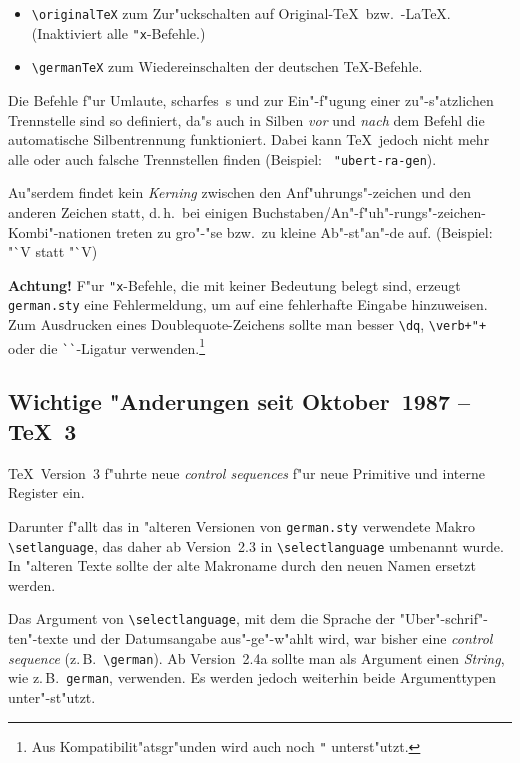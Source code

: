 \begin{itemize}
\item
\verb:\originalTeX:
zum Zur"uckschalten auf Original-\TeX\ bzw.\ \mbox{-\LaTeX}.
(Inaktiviert alle \verb:"x:-Befehle.)

\item
\verb:\germanTeX:
zum Wiedereinschalten der deutschen \TeX-Befehle.
\end{itemize}

Die Befehle f"ur Umlaute, scharfes~s und zur Ein"-f"ugung einer
zu"-s"atzlichen Trennstelle sind so definiert, da"s auch in
Silben {\em vor\/} und {\em nach\/} dem Befehl die automatische
Silbentrennung funktioniert. Dabei kann \TeX\ jedoch nicht mehr
alle oder auch falsche Trennstellen finden (Beispiel: {\tt
"ubert-ra-gen}).

Au"serdem findet kein {\em Kerning} zwischen den
An\-f"uh\-rungs"-zeichen und den anderen Zeichen statt, d.\,h.\ bei
einigen Buchstaben\slash An"-f"uh"-rungs"-zeichen-Kombi"-nationen
treten zu gro"-"se bzw.\ zu kleine Ab"-st"an"-de auf.  (Beispiel: "`V
statt "`\negthinspace V)

{\bf Achtung!} F"ur \verb:"x:-Befehle, die mit keiner Bedeutung belegt
sind, erzeugt {\tt german.sty} eine Fehlermeldung, um auf eine
fehlerhafte Eingabe hinzuweisen.  Zum Ausdrucken eines
Doublequote-Zeichens sollte man besser \verb:\dq:, \verb:\verb+"+:
oder die \verb:``:-Ligatur verwenden.\footnote{Aus
Kompatibilit"atsgr"unden wird auch noch {\tt \string"\string{\string}}
unterst"utzt.}


\subsection{Wichtige "Anderungen seit Oktober~1987 -- \TeX~3}

\TeX\ Version~3 f"uhrte neue {\em control sequences\/} f"ur
neue Primitive und interne Register ein.

Darunter f"allt das in "alteren Versionen von {\tt german.sty}
verwendete Makro \verb:\setlanguage:, das daher ab Version~2.3 in
\verb:\selectlanguage: umbenannt wurde. In "alteren Texte sollte
der alte Makroname durch den neuen Namen ersetzt werden.

Das Argument von \verb:\selectlanguage:, mit dem die Sprache der
"Uber"-schrif"-ten"-texte und der Datumsangabe aus"-ge"-w"ahlt
wird, war bisher eine {\em control sequence\/} (z.\,B.\
\verb:\german:). Ab Version~2.4a sollte man als Argument einen
{\em String}, wie z.\,B.\ \verb:german:, verwenden. Es werden
jedoch weiterhin beide Argumenttypen unter"-st"utzt.


